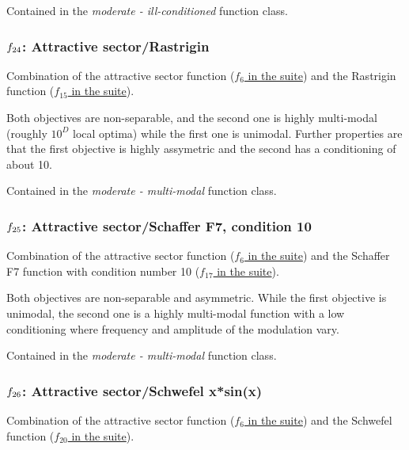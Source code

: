 \documentclass[letterpaper,12pt,english]{article}
\begin{document}
Contained in the \emph{moderate - ill-conditioned} function class.


\subsubsection{\protect\(f_{24}\protect\): Attractive sector/Rastrigin}
\label{index:attractive-sector-rastrigin}\label{index:f24}
Combination of the attractive sector function (\href{http://coco.lri.fr/downloads/download15.03/bbobdocfunctions.pdf\#page=30}{\(f_6\) in the  suite}) and the Rastrigin function
(\href{http://coco.lri.fr/downloads/download15.03/bbobdocfunctions.pdf\#page=75}{\(f_{15}\) in the  suite}).

Both objectives are non-separable, and the second one
is highly multi-modal (roughly \(10^D\) local
optima) while the first one is unimodal. Further
properties are that the first objective is highly
assymetric and the second has a conditioning of about 10.

Contained in the \emph{moderate - multi-modal} function class.


\subsubsection{\protect\(f_{25}\protect\): Attractive sector/Schaffer F7, condition 10}
\label{index:attractive-sector-schaffer-f7-condition-10}\label{index:f25}
Combination of the attractive sector function (\href{http://coco.lri.fr/downloads/download15.03/bbobdocfunctions.pdf\#page=30}{\(f_6\) in the  suite}) and the Schaffer F7 function with condition number 10
(\href{http://coco.lri.fr/downloads/download15.03/bbobdocfunctions.pdf\#page=85}{\(f_{17}\) in the  suite}).

Both objectives are non-separable and asymmetric.
While the first objective is unimodal, the second one is
a highly multi-modal function with a low conditioning where
frequency and amplitude of the modulation vary.

Contained in the \emph{moderate - multi-modal} function class.


\subsubsection{\protect\(f_{26}\protect\): Attractive sector/Schwefel x*sin(x)}
\label{index:f26}\label{index:attractive-sector-schwefel-x-sin-x}
Combination of the attractive sector function (\href{http://coco.lri.fr/downloads/download15.03/bbobdocfunctions.pdf\#page=30}{\(f_6\) in the  suite}) and the Schwefel function (\href{http://coco.lri.fr/downloads/download15.03/bbobdocfunctions.pdf\#page=100}{\(f_{20}\) in the  suite}).
\end{document}
